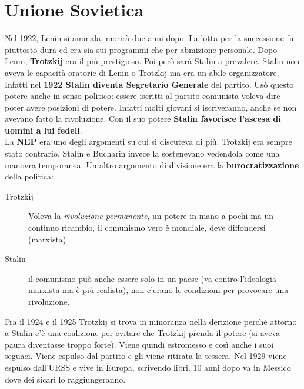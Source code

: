 
\section{Unione Sovietica}
Nel 1922, Lenin si ammala, morirà due anni dopo. La lotta per la successione fu piuttosto dura ed era
sia sui programmi che per abmizione personale. Dopo Lenin, \textbf{Trotzkij} era il più prestigioso.
Poi però sarà Stalin a prevalere. Stalin non aveva le capacità oratorie di Lenin o Trotzkij ma era un
abile organizzatore. Infatti nel \textbf{1922 Stalin diventa Segretario Generale} del partito. Usò
questo potere anche in senso politico: essere iscritti al partito comunista voleva dire poter
avere posizioni di potere. Infatti molti giovani si iscriveranno, anche se non avevano fatto la
rivoluzione. Con il suo potere \textbf{Stalin favorisce l'ascesa di uomini a lui fedeli}.\\
La \textbf{NEP} era uno degli argomenti su cui si discuteva di più. Trotzkij era sempre stato
contrario, Stalin e Bucharin invece la sostenevano vedendola come una manovra temporanea. Un altro
argomento di divisione era la \textbf{burocratizzazione} della politica:
\begin{description}
  \item[Trotzkij] Voleva la \textit{rivoluzione permanente}, un potere in mano a pochi ma un continuo
    ricambio, il comunismo vero è mondiale, deve diffondersi (marxista)
  \item[Stalin] il comunismo può anche essere solo in un paese (va contro l'ideologia marxista ma è
    più realista), non c'erano le condizioni per provocare una rivoluzione.
\end{description}
Fra il 1924 e il 1925 Trotzkij si trova in minoranza nella derizione perché attorno a Stalin c'è una
coalizione per evitare che Trotzkij prenda il potere (si aveva paura diventasse troppo forte). Viene
quindi estromesso e così anche i suoi seguaci. Viene espulso dal partito e gli viene ritirata la
tessera. Nel 1929 viene espulso dall'URSS e vive in Europa, scrivendo libri. 10 anni dopo va in 
Messico dove dei sicari lo raggiungeranno.

